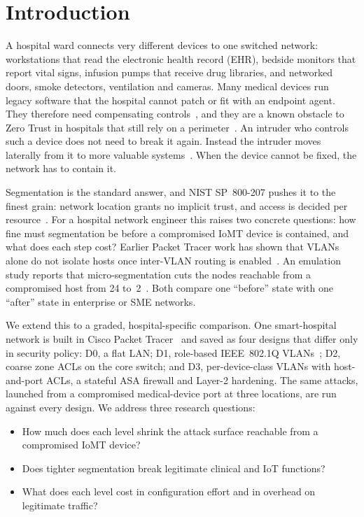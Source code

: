 \section{Introduction}
\label{sec:intro}
A hospital ward connects very different devices to one switched network: workstations that read the electronic health record (EHR), bedside monitors that report vital signs, infusion pumps that receive drug libraries, and networked doors, smoke detectors, ventilation and cameras. Many medical devices run legacy software that the hospital cannot patch or fit with an endpoint agent. They therefore need compensating controls~\cite{Tervoort2020SolutionsMitigating}, and they are a known obstacle to Zero Trust in hospitals that still rely on a perimeter~\cite{Tyler2021TrustNo}. An intruder who controls such a device does not need to break it again. Instead the intruder moves laterally from it to more valuable systems~\cite{Smiliotopoulos2024DetectingLateral}. When the device cannot be fixed, the network has to contain it.

Segmentation is the standard answer, and NIST SP~800-207 pushes it to the finest grain: network location grants no implicit trust, and access is decided per resource~\cite{nist80027}. For a hospital network engineer this raises two concrete questions: how fine must segmentation be before a compromised IoMT device is contained, and what does each step cost? Earlier Packet Tracer work has shown that VLANs alone do not isolate hosts once inter-VLAN routing is enabled~\cite{Sifawa2026ImplementationEvaluation}. An emulation study reports that micro-segmentation cuts the nodes reachable from a compromised host from 24 to~2~\cite{Odule2026SimulationValidation}. Both compare one ``before'' state with one ``after'' state in enterprise or SME networks.

We extend this to a graded, hospital-specific comparison. One smart-hospital network is built in Cisco Packet Tracer~\cite{packettracer} and saved as four designs that differ only in security policy: D0, a flat LAN; D1, role-based IEEE~802.1Q VLANs~\cite{ieee8021q}; D2, coarse zone ACLs on the core switch; and D3, per-device-class VLANs with host-and-port ACLs, a stateful ASA firewall and Layer-2 hardening. The same attacks, launched from a compromised medical-device port at three locations, are run against every design. We address three research questions:
\begin{itemize}
\item[\textbf{RQ1}] How much does each level shrink the attack surface reachable from a compromised IoMT device?
\item[\textbf{RQ2}] Does tighter segmentation break legitimate clinical and IoT functions?
\item[\textbf{RQ3}] What does each level cost in configuration effort and in overhead on legitimate traffic?
\end{itemize}

